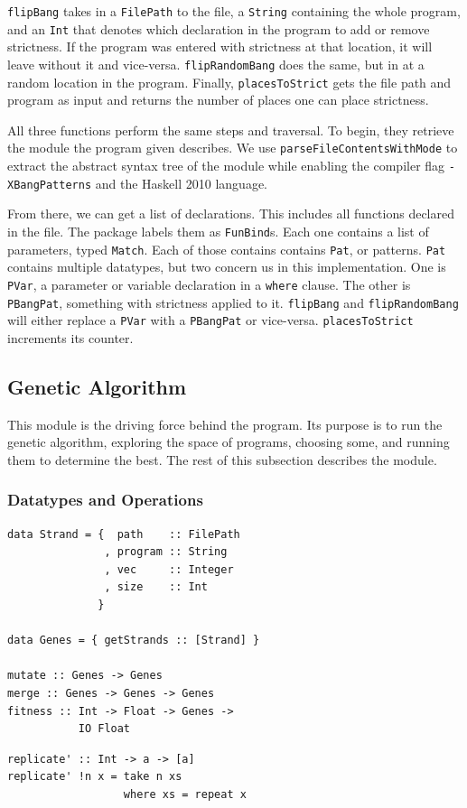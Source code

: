 \documentclass[preprint,nocopyrightspace]{sigplanconf}
\begin{document}
\lstinline!flipBang! takes in a \lstinline!FilePath! to the file, a \lstinline!String! containing the whole program, and an \lstinline!Int! that denotes which declaration in the program to add or remove strictness. If the program was entered with strictness at that location, it will leave without it and vice-versa. \lstinline!flipRandomBang! does the same, but in at a random location in the program. Finally, \lstinline!placesToStrict! gets the file path and program as input and returns the number of places one can place strictness.

All three functions perform the same steps and traversal. To begin, they retrieve the module the program given describes. We use \lstinline!parseFileContentsWithMode! to extract the abstract syntax tree of the module while enabling the compiler flag \lstinline!-XBangPatterns! and the Haskell 2010 language. 

From there, we can get a list of declarations. This includes all functions declared in the file. The package labels them as \lstinline!FunBind!s. Each one contains a list of parameters, typed \lstinline!Match!. Each of those contains contains \lstinline!Pat!, or patterns. \lstinline!Pat! contains multiple datatypes, but two concern us in this implementation. One is \lstinline!PVar!, a parameter or variable declaration in a \lstinline!where! clause. The other is \lstinline!PBangPat!, something with strictness applied to it. \lstinline!flipBang! and \lstinline!flipRandomBang! will either replace a \lstinline!PVar! with a \lstinline!PBangPat! or vice-versa. \lstinline!placesToStrict! increments its counter.

\subsection{Genetic Algorithm}
This module is the driving force behind the program. Its purpose is to run the genetic algorithm, exploring the space of programs, choosing some, and running them to determine the best. The rest of this subsection describes the module.
\subsubsection{Datatypes and Operations}
\begin{lstlisting}[float,caption=Datatypes and operations in Genetic module,label={lst:genetic},frame=single]
data Strand = {  path    :: FilePath
               , program :: String
               , vec     :: Integer
               , size    :: Int
              }

data Genes = { getStrands :: [Strand] }

mutate :: Genes -> Genes
merge :: Genes -> Genes -> Genes
fitness :: Int -> Float -> Genes -> 
           IO Float
\end{lstlisting}
\begin{lstlisting}[float,caption=Example program,label={lst:example},frame=single]
replicate' :: Int -> a -> [a]
replicate' !n x = take n xs
                  where xs = repeat x
\end{lstlisting}
\end{document}
